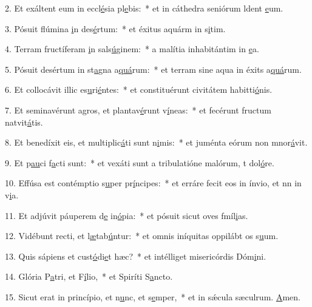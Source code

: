 2. Et exáltent eum in eccl\uline{é}sia pl\uline{e}bis:~* et in cáthedra seniórum ldent \uline{e}um.\par 
3. Pósuit flúmina \uline{i}n des\uline{é}rtum:~* et éxitus aquárm in s\uline{i}tim.\par 
4. Terram fructíferam \uline{i}n sals\uline{ú}ginem:~* a malítia inhabitántim in \uline{e}a.\par 
5. Pósuit desértum in st\uline{a}gna a\uline{quá}rum:~* et terram sine aqua in éxits a\uline{quá}rum.\par 
6. Et collocávit illic es\uline{u}ri\uline{é}ntes:~* et constituérunt civitátem habitti\uline{ó}nis.\par 
7. Et seminavérunt agros, et plantav\uline{é}runt v\uline{í}neas:~* et fecérunt fructum natvit\uline{á}tis.\par 
8. Et benedíxit eis, et multiplic\uline{á}ti sunt n\uline{i}mis:~* et juménta eórum non mnor\uline{á}vit.\par 
9. Et p\uline{au}ci f\uline{a}cti sunt:~* et vexáti sunt a tribulatióne malórum, t dol\uline{ó}re.\par 
10. Effúsa est contémptio s\uline{u}per pr\uline{í}ncipes:~* et erráre fecit eos in ínvio, et nn in v\uline{i}a.\par 
11. Et adjúvit páuperem d\uline{e} in\uline{ó}pia:~* et pósuit sicut oves fmíl\uline{i}as.\par 
12. Vidébunt recti, et l\uline{æ}tab\uline{ú}ntur:~* et omnis iníquitas oppilábt os s\uline{u}um.\par 
13. Quis sápiens et cust\uline{ó}di\uline{e}t hæc?~* et intélliget misericórdis Dóm\uline{i}ni.\par 
14. Glória P\uline{a}tri, et F\uline{í}lio,~* et Spiríti S\uline{a}ncto.\par 
15. Sicut erat in princípio, et n\uline{u}nc, et s\uline{e}mper,~* et in sǽcula sæculrum. \uline{A}men.\par 
